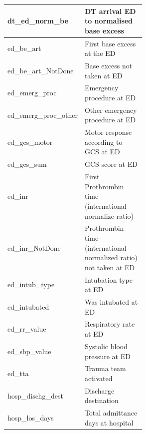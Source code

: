 \documentclass[12pt, letterpaper]{article}
\begin{document}
\begin{appendices}
\begin{longtable}[c]{@{}|l|p{0.55\linewidth}|@{}}
        dt\_ed\_norm\_be                            & DT arrival ED to normalised base excess                           \\\hline
        ed\_be\_art                                 & First base excess at the ED                                       \\\hline
        ed\_be\_art\_NotDone                        & Base excess not taken at ED                                       \\\hline
        ed\_emerg\_proc                             & Emergency procedure at ED                                         \\\hline
        ed\_emerg\_proc\_other                      & Other emergency procedure at ED                                   \\\hline
        ed\_gcs\_motor                              & Motor response according to GCS at ED                             \\\hline
        ed\_gcs\_sum                                & GCS score at ED                                                   \\\hline
        ed\_inr                                     & First Prothrombin time (international normalize ratio)            \\\hline
        ed\_inr\_NotDone                            & Prothrombin time (international normalized ratio) not taken at ED \\\hline
        ed\_intub\_type                             & Intubation type at ED                                             \\\hline
        ed\_intubated                               & Was intubated at ED                                               \\\hline
        ed\_rr\_value                               & Respiratory rate at ED                                            \\\hline
        ed\_sbp\_value                              & Systolic blood pressure at ED                                     \\\hline
        ed\_tta                                     & Trauma team activated                                             \\\hline
        hosp\_dischg\_dest                          & Discharge destination                                             \\\hline
        hosp\_los\_days                             & Total admittance days at hospital                                 \\\hline

\end{longtable}
\end{appendices}
\end{document}
